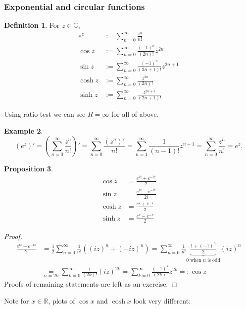 \documentclass[a4paper]{article}
\theoremstyle{definition}
\newtheorem{defn}{Definition}[subsection]
\newtheorem{prop}[defn]{Proposition}
\newtheorem{example}[defn]{Example}
\begin{document}
\subsubsection{Exponential and circular functions}
\begin{defn}
For $z\in \mathbb C$,
\[
\begin{aligned}
e^z &:= \sum_{n=0}^\infty \frac{z^n}{n!} \\
\cos z &:= \sum_{n=0}^\infty \frac{(-1)^n}{(2n)!} z^{2n}\\
\sin z &:= \sum_{n=0}^\infty \frac{(-1)^n}{(2n+1)!} z^{2n+1}\\
\cosh z &:= \sum_{n=0}^\infty \frac{z^{2n}}{(2n)!}\\
\sinh z &:= \sum_{n=0}^\infty \frac{z^{2n+1}}{(2n+1)!}
\end{aligned}
\]
\end{defn}
Using ratio test we can see $R=\infty$ for all of above.

\begin{example}
\[
\left( e^z \right)' = \left(\sum_{n=0}^\infty \frac{z^n}{n!} \right)' = \sum_{n=0}^\infty \frac{(z^n)'}{n!} = \sum_{n=1}^\infty \frac{1}{(n-1)!} z^{n-1} = \sum_{n=0}^\infty \frac{z^n}{n!} = e^z.
\]
\end{example}
\begin{prop}
\[
\begin{aligned}
\cos z &= \frac{e^{iz}+e^{-iz}}{2} \\
\sin z &= \frac{e^{iz}-e^{-iz}}{2i} \\
\cosh z &= \frac{e^z+e^{-z}}{2} \\
\sinh z &= \frac{e^z-e^{-z}}{2}
\end{aligned}
\]
\end{prop}
\begin{proof}
\[
\begin{aligned}
\frac{e^{iz}+e^{-iz}}{2} &= \frac12 \sum_{n=0}^\infty \frac{1}{n!} ((iz)^n+(-iz)^n) = \sum_{n=0}^\infty \frac{1}{n!} \underbrace{\frac{1+(-1)^n}{2}}_{0\text{ when }n\text{ is odd}} (iz)^n \\&\underset{n=2k}{=} \sum_{k=0}^\infty \frac{1}{(2k)!} (iz)^{2k} = \sum_{k=0}^\infty \frac{(-1)^k}{(2k)!} z^{2k} =: \cos z
\end{aligned}
\]
Proofs of remaining statements are left as an exercise.
\end{proof}

Note for $x\in \mathbb R$, plots of $\cos x$ and $\cosh x$ look very different:
\end{document}
